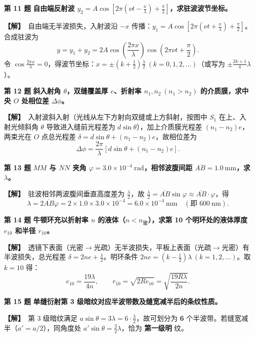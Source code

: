 \documentclass[zihao=5,a4paper,UTF8]{ctexart}
\newenvironment{prob}[2]{%
    \par\vspace{5pt}\noindent\textbf{\color{navy}#1} \textbf{#2}\par\nopagebreak\vspace{2pt}%
}{%
    \par\vspace{3pt}%
}
\newcommand{\sol}{\noindent\textbf{\color{tealaccent}【解】}\ }
\begin{document}
\begin{prob}{第 11 题}{自由端反射波 $y_2 = A\cos\left[2\pi\left(\nu t - \frac{x}{\lambda}\right) + \frac{\pi}{2}\right]$，求驻波波节坐标。}
\sol 自由端无半波损失，入射波沿 $-x$ 传播：$y_1 = A\cos\left[2\pi\left(\nu t + \frac{x}{\lambda}\right) + \frac{\pi}{2}\right]$。合成驻波为
\[
    y = y_1 + y_2 = 2A\cos\left(\frac{2\pi x}{\lambda}\right)\cos\left(2\pi\nu t + \frac{\pi}{2}\right).
\]
令 $\cos\frac{2\pi x}{\lambda} = 0$，得波节坐标：$x = \pm\left(k + \frac{1}{2}\right)\frac{\lambda}{2}\ (k=0,1,2,\dots)$（或写为 $\pm\frac{2k+1}{4}\lambda$）。
\end{prob}

\begin{prob}{第 12 题}{斜入射角 $\theta$，双缝覆盖厚 $e$、折射率 $n_1, n_2\ (n_1>n_2)$ 的介质膜，求中央 $O$ 处相位差 $\Delta\phi$。}
\sol 入射波斜入射（光线从左下方射向双缝或上方斜射，按图中 $S_1$ 在上、入射光倾斜角 $\theta$ 导致进入缝前光程差为 $d\sin\theta$），加上介质膜光程差 $(n_1 - n_2)e$，两束光在 $O$ 点总光程差 $\delta = d\sin\theta + (n_1 - n_2)e$，故相位差为
\[
    \Delta\phi = \frac{2\pi}{\lambda}\left[d\sin\theta + (n_1 - n_2)e\right].
\]
\end{prob}

\begin{prob}{第 13 题}{$MM$ 与 $NN$ 夹角 $\varphi = 3.0\times 10^{-4}\ \mathrm{rad}$，相邻波腹间距 $\overline{AB}=1.0\ \mathrm{mm}$，求 $\lambda$。}
\sol 驻波相邻两波腹间垂直高度差为 $\frac{\lambda}{2}$，故 $\frac{\lambda}{2} = \overline{AB}\sin\varphi \approx \overline{AB}\cdot\varphi$，得
\[
    \lambda = 2\overline{AB}\varphi = 2\times 1.0\times 3.0\times 10^{-4} = 6.0\times 10^{-4}\ \mathrm{mm}\quad (\text{即 } 600\ \mathrm{nm}).
\]
\end{prob}

\begin{prob}{第 14 题}{牛顿环充以折射率 $n$ 的液体（$n < n_{\text{玻}}$），求第 10 个明环处的液体厚度 $e_{10}$ 和半径 $r_{10}$。}
\sol 透镜下表面（光密$\to$光疏）无半波损失，平板上表面（光疏$\to$光密）有半波损失，总光程差 $\delta = 2ne + \frac{\lambda}{2}$。明环条件 $2ne = \left(k - \frac{1}{2}\right)\lambda\ (k=1,2,\dots)$。取 $k=10$ 得：
\[
    e_{10} = \frac{19\lambda}{4n},\qquad r_{10} = \sqrt{2Re_{10}} = \sqrt{\frac{19R\lambda}{2n}}.
\]
\end{prob}

\begin{prob}{第 15 题}{单缝衍射第 3 级暗纹对应半波带数及缝宽减半后的条纹性质。}
\sol 第 3 级暗纹满足 $a\sin\theta = 3\lambda = 6\cdot\frac{\lambda}{2}$，故可划分为 \textbf{6} 个半波带。若缝宽减半（$a' = a/2$），同角度处 $a'\sin\theta = \frac{3}{2}\lambda$，恰为 \textbf{第一级明} 纹。
\end{prob}
\end{document}
